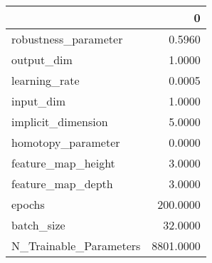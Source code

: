\begin{tabular}{lr}
\toprule
{} &          0 \\
\midrule
robustness\_parameter   &     0.5960 \\
output\_dim             &     1.0000 \\
learning\_rate          &     0.0005 \\
input\_dim              &     1.0000 \\
implicit\_dimension     &     5.0000 \\
homotopy\_parameter     &     0.0000 \\
feature\_map\_height     &     3.0000 \\
feature\_map\_depth      &     3.0000 \\
epochs                 &   200.0000 \\
batch\_size             &    32.0000 \\
N\_Trainable\_Parameters &  8801.0000 \\
\bottomrule
\end{tabular}
